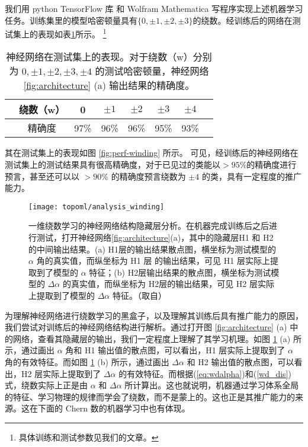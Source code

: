 我们用 python TensorFlow 库 和 Wolfram Mathematica 写程序实现上述机器学习任务。训练集里的模型哈密顿量具有$\{0, \pm1, \pm2, \pm3\}$的绕数。经训练后的网络在测试集上的表现如表\ref{table:winding-sr}所示。
\footnote{具体训练和测试参数见我们的文章。}
\begin{table}[t]
\caption{神经网络在测试集上的表现。对于绕数（w）分别为 $0, \pm1, \pm2, \pm3, \pm4$ 的测试哈密顿量，神经网络 \ref{fig:architecture} (a) 输出结果的精确度。 }\label{table:winding-sr}
\centering
\begin{tabular}{*{8}c}
\hline\hline
& 绕数（w） & 0 & $\pm1$ & $\pm2$ & $\pm3$ & $\pm4$ & \\ \hline
& 精确度 & 97\% & 96\% & 96\% & 95\% & 93\% & \\
\hline\hline
\end{tabular}
\end{table}
其在测试集上的表现如图 \ref{fig:perf-winding} 所示。
可见，经训练后的神经网络在测试集上的测试结果具有很高精确度，对于已见过的类能以$>95\%$的精确度进行预言，甚至还可以以 $>90\%$ 的精确度预言绕数为 $\pm4$ 的类，具有一定程度的推广能力。




\begin{figure}[t]
\centering
\texttt{[image: topoml/analysis\_winding]}
\caption{一维绕数学习的神经网络结构隐藏层分析。在机器完成训练后之后进行测试，打开神经网络\ref{fig:architecture}(a)，其中的隐藏层H1 和 H2 的中间输出结果。(a) H1层的输出结果散点图，横坐标为测试模型的 $\alpha$ 角的真实值，而纵坐标为 H1 层 的输出结果，可见 H1 层实际上提取到了模型的 $\alpha$ 特征；(b) H2层输出结果的散点图，横坐标为测试模型的 $\Delta\alpha$ 的真实值，而纵坐标为 H2层的输出结果，可见 H2 层实际上提取到了模型的 $\Delta\alpha$ 特征。（取自）}
\label{fig:anal-winding}
\end{figure}



为理解神经网络进行绕数学习的黑盒子，以及理解其训练后具有推广能力的原因，我们尝试对训练后的神经网络结构进行解析。通过打开图 \ref{fig:architecture} (a) 中的网络，查看其隐藏层的输出，我们一定程度上理解了其学习机理。如图 \ref{fig:anal-winding} (a) 所示，通过画出 $\alpha$ 角和 H1 输出值的散点图，可以看出，H1 层实际上提取到了 $\alpha$ 角的有效特征。而如图 \ref{fig:anal-winding} (b) 所示，通过画出 $\Delta\alpha$ 和 H2 输出值的散点图，可以看出，H2 层实际上提取到了 $\Delta\alpha$ 的有效特征。而根据(\ref{eq:wdalpha})和(\ref{wd_dis})式，绕数实际上正是由 $\alpha$ 和 $\Delta\alpha$ 所计算出。这也就说明，机器通过学习体系全局的特征、学习物理的规律而学会了绕数，而不是蒙上的。这也正是其推广能力的来源。这在下面的 Chern 数的机器学习中也有体现。




